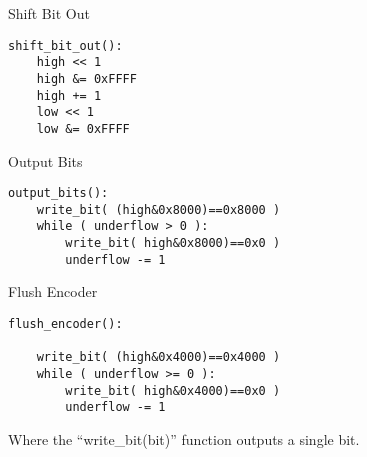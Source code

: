 Shift Bit Out
\begin{verbatim}
shift_bit_out():
    high << 1
    high &= 0xFFFF
    high += 1
    low << 1
    low &= 0xFFFF
\end{verbatim}

Output Bits
\begin{verbatim}
output_bits():
    write_bit( (high&0x8000)==0x8000 )
    while ( underflow > 0 ):
        write_bit( high&0x8000)==0x0 )
        underflow -= 1
\end{verbatim}

Flush Encoder
\begin{verbatim}
flush_encoder():

    write_bit( (high&0x4000)==0x4000 )
    while ( underflow >= 0 ):
        write_bit( high&0x4000)==0x0 )
        underflow -= 1
\end{verbatim}

Where the ``write\_bit(bit)'' function outputs a single bit.

